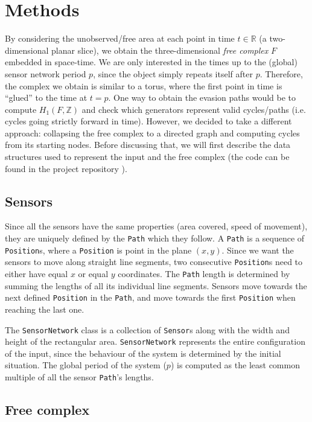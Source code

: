\documentclass{article}
\begin{document}
\section{Methods}

By considering the unobserved/free area at each point in time $t \in \mathbb{R}$ (a two-dimensional planar slice), we obtain the three-dimensional {\it free complex} $F$ embedded in space-time.
We are only interested in the times up to the (global) sensor network period $p$, since the object simply repeats itself after $p$.
Therefore, the complex we obtain is similar to a torus, where the first point in time is ``glued'' to the time at $t = p$.
One way to obtain the evasion paths would be to compute $ H_1 (F, \mathbb{Z}) $ and check which generators represent valid cycles/paths (i.e. cycles going strictly forward in time).
However, we decided to take a different approach: collapsing the free complex to a directed graph and computing cycles from its starting nodes. Before discussing that, we will first describe the data structures used to represent the input and the free complex (the code can be found in the project repository \cite{githubrepo}).

\subsection{Sensors}

Since all the sensors have the same properties (area covered, speed of movement), they are uniquely defined by the \texttt{Path} which they follow.
A \texttt{Path} is a sequence of \texttt{Position}s, where a \texttt{Position} is point in the plane $(x, y)$.
Since we want the sensors to move along straight line segments, two consecutive \texttt{Position}s need to either have equal $x$ or equal $y$ coordinates.
The \texttt{Path} length is determined by summing the lengths of all its individual line segments.
Sensors move towards the next defined \texttt{Position} in the \texttt{Path}, and move towards the first \texttt{Position} when reaching the last one.

The \texttt{SensorNetwork} class is a collection of \texttt{Sensor}s along with the width and height of the rectangular area.
\texttt{SensorNetwork} represents the entire configuration of the input, since the behaviour of the system is determined by the initial situation.
The global period of the system ($p$) is computed as the least common multiple of all the sensor \texttt{Path}'s lengths.

\subsection{Free complex} \label{sec:free_complex}
\end{document}
